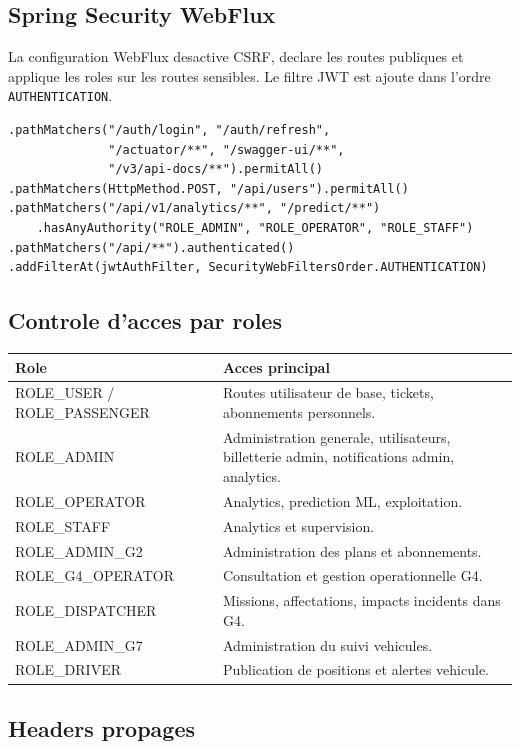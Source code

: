 \documentclass[12pt,a4paper]{article}
\begin{document}
\subsection{Spring Security WebFlux}

La configuration WebFlux desactive CSRF, declare les routes publiques et applique les roles sur les routes sensibles. Le filtre JWT est ajoute dans l'ordre \texttt{AUTHENTICATION}.

\begin{lstlisting}[style=code]
.pathMatchers("/auth/login", "/auth/refresh",
              "/actuator/**", "/swagger-ui/**",
              "/v3/api-docs/**").permitAll()
.pathMatchers(HttpMethod.POST, "/api/users").permitAll()
.pathMatchers("/api/v1/analytics/**", "/predict/**")
    .hasAnyAuthority("ROLE_ADMIN", "ROLE_OPERATOR", "ROLE_STAFF")
.pathMatchers("/api/**").authenticated()
.addFilterAt(jwtAuthFilter, SecurityWebFiltersOrder.AUTHENTICATION)
\end{lstlisting}

\subsection{Controle d'acces par roles}

\begin{longtable}{p{4cm}p{10cm}}
\toprule
\textbf{Role} & \textbf{Acces principal} \\
\midrule
ROLE\_USER / ROLE\_PASSENGER & Routes utilisateur de base, tickets, abonnements personnels. \\
ROLE\_ADMIN & Administration generale, utilisateurs, billetterie admin, notifications admin, analytics. \\
ROLE\_OPERATOR & Analytics, prediction ML, exploitation. \\
ROLE\_STAFF & Analytics et supervision. \\
ROLE\_ADMIN\_G2 & Administration des plans et abonnements. \\
ROLE\_G4\_OPERATOR & Consultation et gestion operationnelle G4. \\
ROLE\_DISPATCHER & Missions, affectations, impacts incidents dans G4. \\
ROLE\_ADMIN\_G7 & Administration du suivi vehicules. \\
ROLE\_DRIVER & Publication de positions et alertes vehicule. \\
\bottomrule
\end{longtable}

\subsection{Headers propages}
\end{document}
